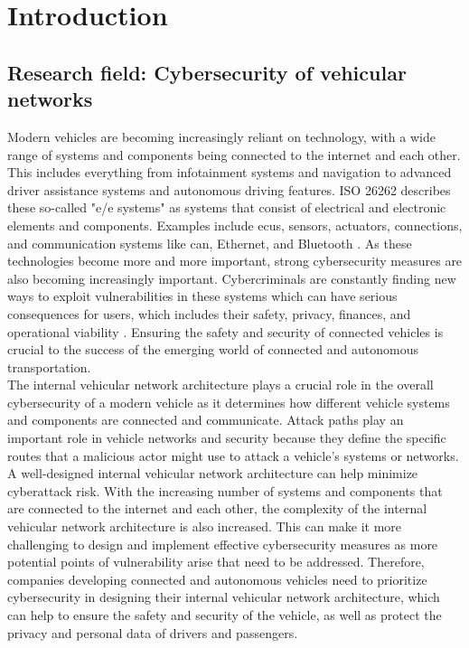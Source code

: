 \chapter{Introduction}
\label{chp:introduction}

\section{Research field: Cybersecurity of vehicular networks}
\label{sec:field}

Modern vehicles are becoming increasingly reliant on technology, with a wide range of systems and components being connected to the internet and each other. 
This includes everything from infotainment systems and navigation to advanced driver assistance systems and autonomous driving features.
ISO 26262 describes these so-called "\gls{e/e} systems" as systems that consist of electrical and electronic elements and components.
Examples include \gls{ecu}s, sensors, actuators, connections, and communication systems like \gls{can}, Ethernet, and Bluetooth \cite{iso26262}.
As these technologies become more and more important, strong cybersecurity measures are also becoming increasingly important. 
Cybercriminals are constantly finding new ways to exploit vulnerabilities in these systems which can have serious consequences for users, 
which includes their safety, privacy, finances, and operational viability \cite{iso21434}. 
Ensuring the safety and security of connected vehicles is crucial to the success of the emerging world of connected and autonomous transportation.
\\

The internal vehicular network architecture plays a crucial role in the overall cybersecurity of a modern vehicle as it determines how different vehicle systems and components are connected and communicate.
Attack paths play an important role in vehicle networks and security because they define the specific routes that a malicious actor might use to attack a vehicle's systems or networks. 
A well-designed internal vehicular network architecture can help minimize cyberattack risk.
With the increasing number of systems and components that are connected to the internet and each other, the complexity of the internal vehicular network architecture is also increased. 
This can make it more challenging to design and implement effective cybersecurity measures as more potential points of vulnerability arise that need to be addressed. 
Therefore, companies developing connected and autonomous vehicles need to prioritize cybersecurity in designing their internal vehicular network architecture, 
which can help to ensure the safety and security of the vehicle, as well as protect the privacy and personal data of drivers and passengers.
\\

